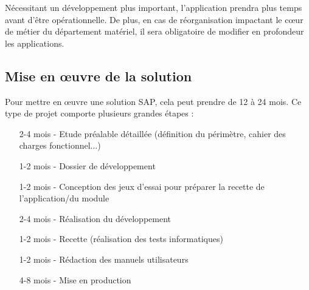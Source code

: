 Nécessitant un développement plus important, l'application prendra plus temps
avant d'être opérationnelle. De plus, en cas de réorganisation
impactant le cœur de métier du département matériel, il sera obligatoire de modifier
en profondeur les applications. 

\subsection{Mise en œuvre de la solution}
Pour mettre en œuvre une solution SAP, cela peut prendre de 12 à 24 mois.
Ce type de projet comporte plusieurs grandes étapes :

\begin{itemize}
	\item[2-4 mois -] Etude préalable détaillée (définition du périmètre, cahier des charges fonctionnel...)
	\item[1-2 mois -] Dossier de développement
	\item[1-2 mois -] Conception des jeux d’essai pour préparer la recette de l'application/du module
	\item[2-4 mois -] Réalisation du développement
	\item[1-2 mois -] Recette (réalisation des tests informatiques)
	\item[1-2 mois -] Rédaction des manuels utilisateurs
	\item[4-8 mois -] Mise en production
\end{itemize}
